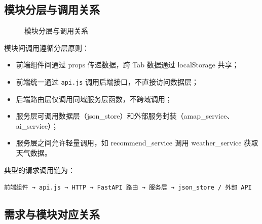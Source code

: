 \documentclass[12pt,a4paper]{ctexart}
\begin{document}
\subsection{模块分层与调用关系}

\begin{figure}[H]
  \centering
  \caption{模块分层与调用关系}
  \label{fig:module-relations}
\end{figure}

模块间调用遵循分层原则：
\begin{itemize}
  \item 前端组件间通过 props 传递数据，跨 Tab 数据通过 localStorage 共享；
  \item 前端统一通过 \texttt{api.js} 调用后端接口，不直接访问数据层；
  \item 后端路由层仅调用同域服务层函数，不跨域调用；
  \item 服务层可调用数据层（json\_store）和外部服务封装（amap\_service、ai\_service）；
  \item 服务层之间允许轻量调用，如 recommend\_service 调用 weather\_service 获取天气数据。
\end{itemize}

典型的请求调用链为：
\begin{center}
\texttt{前端组件 → api.js → HTTP → FastAPI 路由 → 服务层 → json\_store / 外部 API}
\end{center}

\subsection{需求与模块对应关系}
\end{document}
